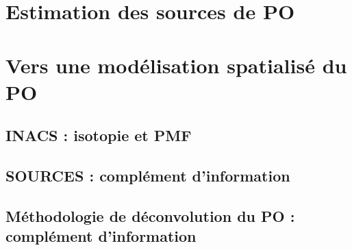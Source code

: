 \documentclass[a4paper,12pt]{book}
\begin{document}
\chapter{Estimation des sources de PO}
\label{cha:estimation_des_sources_de_PO}
\PartialToc
\clearpage

\clearpage
\printbibliography[segment=\therefsegment,heading=subbibliography]

% 

\chapter{Vers une modélisation spatialisé du PO}
\label{cha:spatio_temporal_modelizing}
\PartialToc
\clearpage
% 
\printbibliography[segment=\therefsegment,heading=subbibliography]

\printbibliography


\appendix
\setcounter{table}{0}
\setcounter{figure}{0}
\setcounter{equation}{0}
\renewcommand{\thetable}{\thesection-\arabic{table}}
\renewcommand{\thefigure}{\thesection-\arabic{figure}}
\renewcommand{\theequation}{\thesection-\arabic{equation}}

\section{INACS : isotopie et PMF}%
\label{annexe:INACS}
% 

\section{SOURCES : complément d'information}
\label{annexe:SOURCES_SI}
% 

\section{Méthodologie de déconvolution du PO : complément d'information}
\label{annexe:deconvol_OP_SI}


\end{document}

